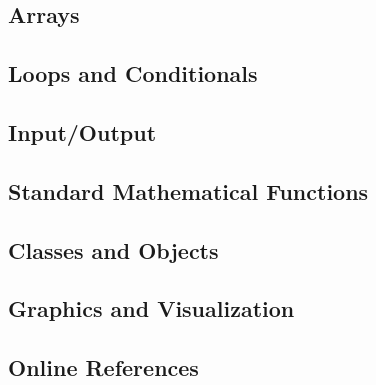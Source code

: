 \subsection{Arrays}
\label{sec:Arrays}


\subsection{Loops and Conditionals}
\label{sec:Loops_and_Conditionals}


\subsection{Input/Output}
\label{sec:Input/Output}


\subsection{Standard Mathematical Functions}
\label{sec:Standard_Mathematical_Functions}



\subsection{Classes and Objects}
\label{sec:Classes_and_Objects}


\subsection{Graphics and Visualization}
\label{sec:Graphics_and_Visualization}


\subsection{Online References}
\label{sec:Online_Refernces}




